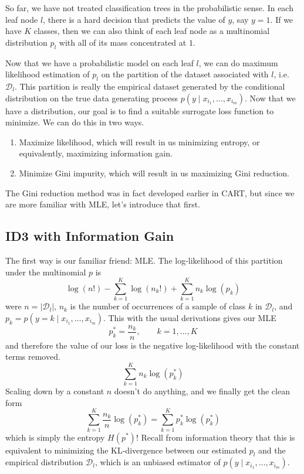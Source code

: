   So far, we have not treated classification trees in the probabilistic sense. In each leaf node $l$, there is a hard decision that predicts the value of $y$, say $y = 1$. If we have $K$ classes, then we can also think of each leaf node as a multinomial distribution $p_l$ with all of its mass concentrated at $1$. 

  Now that we have a probabilistic model on each leaf $l$, we can do maximum likelihood estimation of $p_l$ on the partition of the dataset associated with $l$, i.e. $\mathcal{D}_l$. This partition is really the empirical dataset generated by the conditional distribution on the true data generating process $p(y \mid x_{i_1}, \ldots, x_{i_m})$. Now that we have a distribution, our goal is to find a suitable surrogate loss function to minimize. We can do this in two ways. 
  \begin{enumerate}
    \item Maximize likelihood, which will result in us minimizing entropy, or equivalently, maximizing information gain. 
    \item Minimize Gini impurity, which will result in us maximizing Gini reduction. 
  \end{enumerate}
  The Gini reduction method was in fact developed earlier in CART, but since we are more familiar with MLE, let's introduce that first. 

\subsection{ID3 with Information Gain}

  The first way is our familiar friend: MLE. The log-likelihood of this partition under the multinomial $p$ is 
  \begin{equation}
    \log(n!) - \sum_{k=1}^K \log(n_k !) + \sum_{k=1}^K n_k \log(p_k)
  \end{equation}
  were $n = |\mathcal{D}_l|$, $n_k$ is the number of occurrences of a sample of class $k$ in $\mathcal{D}_l$, and $p_k = p(y = k \mid x_{i_1}, \ldots, x_{i_m})$. This with the usual derivations gives our MLE 
  \begin{equation}
    p_k^\ast = \frac{n_k}{n}, \qquad k = 1, \ldots, K
  \end{equation}
  and therefore the value of our loss is the negative log-likelihood with the constant terms removed. 
  \begin{equation}
    \sum_{k=1}^K n_k \log(p_k^\ast)
  \end{equation}
  Scaling down by a constant $n$ doesn't do anything, and we finally get the clean form 
  \begin{equation}
    \sum_{k=1}^K \frac{n_k}{n} \log(p_k^\ast) = \sum_{k=1}^K p_k^\ast \log(p_k^\ast)
  \end{equation}
  which is simply the entropy $H(p^\ast)$! Recall from information theory that this is equivalent to minimizing the KL-divergence between our estimated $p_l$ and the empirical distribution $\mathcal{D}_l$, which is an unbiased estimator of $p(y \mid x_{i_1}, \ldots, x_{i_m})$. 

